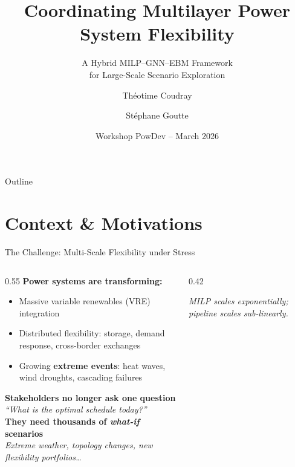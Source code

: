 \documentclass[aspectratio=169, 10pt]{beamer}
\title{Coordinating Multilayer Power System Flexibility}
\subtitle{A Hybrid MILP--GNN--EBM Framework\\for Large-Scale Scenario Exploration}
\author{Th\'eotime Coudray \and St\'ephane Goutte}
\institute{UVSQ -- UMI SOURCE -- Projet PowDev}
\date{Workshop PowDev -- March 2026}
\newcommand{\highlight}[1]{\textcolor{powOrange}{\textbf{#1}}}
\begin{document}
\begin{frame}[plain]
  \titlepage
\end{frame}

\begin{frame}{Outline}
  \tableofcontents
\end{frame}

\section{Context \& Motivations}

\begin{frame}{The Challenge: Multi-Scale Flexibility under Stress}
\begin{columns}[T]
\begin{column}{0.55\textwidth}
\textbf{Power systems are transforming:}
\begin{itemize}
  \item Massive variable renewables (VRE) integration
  \item Distributed flexibility: storage, demand response, cross-border exchanges
  \item Growing \highlight{extreme events}: heat waves, wind droughts, cascading failures
\end{itemize}
\vspace{0.5em}
\textbf{Stakeholders no longer ask one question}\\[2pt]
\emph{``What is the optimal schedule today?''}\\[4pt]
\textbf{They need thousands of \emph{what-if} scenarios}\\[2pt]
\emph{Extreme weather, topology changes, new flexibility portfolios\ldots}
\end{column}
\begin{column}{0.42\textwidth}
\centering
{}
\vspace{0.3em}
{\scriptsize \textit{MILP scales exponentially; pipeline scales sub-linearly.}}
\end{column}
\end{columns}
\end{frame}
\end{document}

